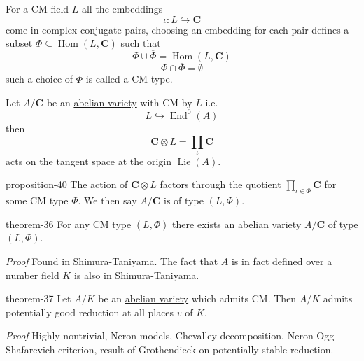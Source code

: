 \documentclass[10pt,]{book}
\makeatletter
\renewcommand*{\proofname}{Proof}
\renewenvironment{proof}[1][\proofname]{\par
  \pushQED{\qed}%
  \normalfont \topsep6\p@\@plus6\p@\relax
  \trivlist
  \item\relax
    {\itshape
    #1\@addpunct{.}}\hspace\labelsep\ignorespaces
}{%
  \popQED\endtrivlist\@endpefalse
}
\numberwithin{equation}{section}
\newcommand{\Lie}{\operatorname{Lie}}
\newcommand{\CC}{\mathbf{C}}
\DeclareMathOperator{\End}{End}
\DeclareMathOperator{\Hom}{Hom}
\makeatother
\begin{document}
For a CM field \(L\) all the embeddings%
\begin{equation*}
\iota\colon L \hookrightarrow \CC
\end{equation*}
come in complex conjugate pairs, choosing an embedding for each pair defines a subset \(\Phi\subseteq \Hom(L, \CC)\) such that%
\begin{equation*}
\Phi \cup \overline \Phi = \Hom(L,\CC)
\end{equation*}
%
\begin{equation*}
\Phi \cap \overline \Phi = \emptyset
\end{equation*}
such a choice of \(\Phi \) is called a CM type.%
\par
\hypertarget{p-442}{}%
Let \(A/\CC\) be an \hyperref[def-buntes-abvar]{abelian variety} with CM by \(L\) i.e.%
\begin{equation*}
L\hookrightarrow \End^0(A)
\end{equation*}
then%
\begin{equation*}
\CC\otimes L = \prod_\iota \CC
\end{equation*}
acts on the tangent space at the origin \(\Lie(A)\).%
\begin{proposition}{}{}{proposition-40}%
\hypertarget{p-443}{}%
The action of \(\CC\otimes L\) factors through the quotient \(\prod_{\iota\in \Phi} \CC\) for some CM type \(\Phi\). We then say \(A/\CC\) is of type \((L,\Phi)\).%
\end{proposition}
\begin{theorem}{}{}{theorem-36}%
\hypertarget{p-444}{}%
For any CM type \((L,\Phi)\) there exists an \hyperref[def-buntes-abvar]{abelian variety} \(A/\CC\) of type \((L, \Phi)\).%
\end{theorem}
\begin{proof}\hypertarget{proof-76}{}
\hypertarget{p-445}{}%
Found in Shimura-Taniyama.%
\end{proof}
\hypertarget{p-446}{}%
The fact that \(A\) is in fact defined over  a number field \(K\) is also in Shimura-Taniyama.%
\begin{theorem}{}{}{theorem-37}%
\hypertarget{p-447}{}%
Let \(A/K\) be an \hyperref[def-buntes-abvar]{abelian variety} which admits CM. Then \(A/K\) admits potentially good reduction at all places \(v\) of \(K\).%
\end{theorem}
\begin{proof}\hypertarget{proof-77}{}
\hypertarget{p-448}{}%
Highly nontrivial, Neron models, Chevalley decomposition, Neron-Ogg-Shafarevich criterion, result of Grothendieck on potentially stable reduction.%
\end{proof}
\end{document}
